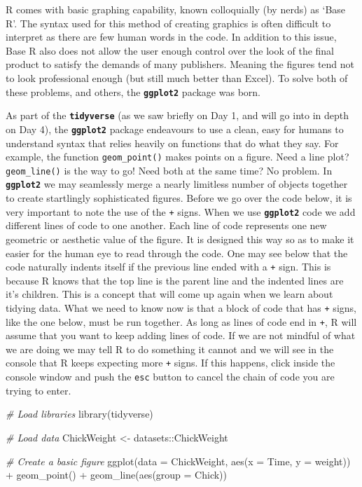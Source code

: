 \documentclass[
]{book}
\newenvironment{Shaded}{\begin{snugshade}}{\end{snugshade}}
\newcommand{\AttributeTok}[1]{\textcolor[rgb]{0.77,0.63,0.00}{#1}}
\newcommand{\CommentTok}[1]{\textcolor[rgb]{0.56,0.35,0.01}{\textit{#1}}}
\newcommand{\FunctionTok}[1]{\textcolor[rgb]{0.00,0.00,0.00}{#1}}
\newcommand{\NormalTok}[1]{#1}
\newcommand{\OtherTok}[1]{\textcolor[rgb]{0.56,0.35,0.01}{#1}}
\newcommand{\SpecialCharTok}[1]{\textcolor[rgb]{0.00,0.00,0.00}{#1}}
\begin{document}
R comes with basic graphing capability, known colloquially (by nerds) as `Base R'. The syntax used for this method of creating graphics is often difficult to interpret as there are few human words in the code. In addition to this issue, Base R also does not allow the user enough control over the look of the final product to satisfy the demands of many publishers. Meaning the figures tend not to look professional enough (but still much better than Excel). To solve both of these problems, and others, the \textbf{\texttt{ggplot2}} package was born.

As part of the \textbf{\texttt{tidyverse}} (as we saw briefly on Day 1, and will go into in depth on Day 4), the \textbf{\texttt{ggplot2}} package endeavours to use a clean, easy for humans to understand syntax that relies heavily on functions that do what they say. For example, the function \texttt{geom\_point()} makes points on a figure. Need a line plot? \texttt{geom\_line()} is the way to go! Need both at the same time? No problem. In \textbf{\texttt{ggplot2}} we may seamlessly merge a nearly limitless number of objects together to create startlingly sophisticated figures. Before we go over the code below, it is very important to note the use of the \texttt{+} signs. When we use \textbf{\texttt{ggplot2}} code we add different lines of code to one another. Each line of code represents one new geometric or aesthetic value of the figure. It is designed this way so as to make it easier for the human eye to read through the code.
One may see below that the code naturally indents itself if the previous line ended with a \texttt{+} sign. This is because R knows that the top line is the parent line and the indented lines are it's children. This is a concept that will come up again when we learn about tidying data. What we need to know now is that a block of code that has \texttt{+} signs, like the one below, must be run together. As long as lines of code end in \texttt{+}, R will assume that you want to keep adding lines of code. If we are not mindful of what we are doing we may tell R to do something it cannot and we will see in the console that R keeps expecting more \texttt{+} signs. If this happens, click inside the console window and push the \texttt{esc} button to cancel the chain of code you are trying to enter.

\begin{Shaded}
\begin{Highlighting}[]
\CommentTok{\# Load libraries}
\FunctionTok{library}\NormalTok{(tidyverse)}

\CommentTok{\# Load data}
\NormalTok{ChickWeight }\OtherTok{\textless{}{-}}\NormalTok{ datasets}\SpecialCharTok{::}\NormalTok{ChickWeight}

\CommentTok{\# Create a basic figure}
\FunctionTok{ggplot}\NormalTok{(}\AttributeTok{data =}\NormalTok{ ChickWeight, }\FunctionTok{aes}\NormalTok{(}\AttributeTok{x =}\NormalTok{ Time, }\AttributeTok{y =}\NormalTok{ weight)) }\SpecialCharTok{+}
  \FunctionTok{geom\_point}\NormalTok{() }\SpecialCharTok{+}
  \FunctionTok{geom\_line}\NormalTok{(}\FunctionTok{aes}\NormalTok{(}\AttributeTok{group =}\NormalTok{ Chick))}
\end{Highlighting}
\end{Shaded}
\end{document}
